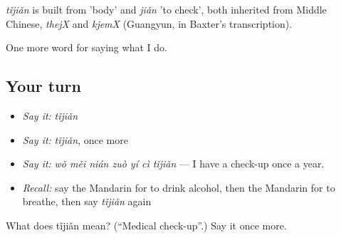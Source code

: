 \begin{cousinweb}
\emph{tǐjiǎn} is built from  'body' and \emph{jiǎn} 'to check', both inherited from Middle Chinese, \emph{thejX} and \emph{kjemX} (Guangyun, in Baxter's transcription).
\end{cousinweb}

\begin{grammarlens}[title={What you've built}]
One more word for saying what I do.
\end{grammarlens}

\subsection*{Your turn}
\begin{itemize}
\raggedright
  \item \emph{Say it:} \emph{tǐjiǎn}
  \item \emph{Say it:} \emph{tǐjiǎn}, once more
  \item \emph{Say it:} \emph{wǒ měi nián zuò yí cì tǐjiǎn} — I have a check-up once a year.
  \item \emph{Recall:} say the Mandarin for to drink alcohol, then the Mandarin for to breathe, then say \emph{tǐjiǎn} again
\end{itemize}

\begin{tcolorbox}[breakable,colback=teal!4,colframe=teal!35!black,title={Before you move on}]
What does tǐjiǎn mean? (\textquotedblleft{}Medical check-up\textquotedblright{}.) Say it once more.
\end{tcolorbox}
